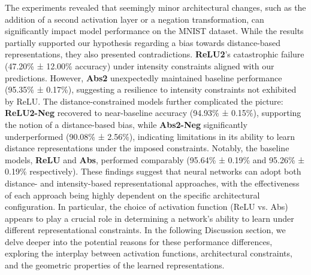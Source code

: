 The experiments revealed that seemingly minor architectural changes, such as the addition of a second activation layer or a negation transformation, can significantly impact model performance on the MNIST dataset. While the results partially supported our hypothesis regarding a bias towards distance-based representations, they also presented contradictions. \textbf{ReLU2}'s catastrophic failure (47.20\% ± 12.00\% accuracy) under intensity constraints aligned with our predictions. However, \textbf{Abs2} unexpectedly maintained baseline performance (95.35\% ± 0.17\%), suggesting a resilience to intensity constraints not exhibited by ReLU. The distance-constrained models further complicated the picture: \textbf{ReLU2-Neg} recovered to near-baseline accuracy (94.93\% ± 0.15\%), supporting the notion of a distance-based bias, while \textbf{Abs2-Neg} significantly underperformed (90.08\% ± 2.56\%), indicating limitations in its ability to learn distance representations under the imposed constraints. Notably, the baseline models, \textbf{ReLU} and \textbf{Abs}, performed comparably (95.64\% ± 0.19\% and 95.26\% ± 0.19\% respectively). These findings suggest that neural networks can adopt both distance- and intensity-based representational approaches, with the effectiveness of each approach being highly dependent on the specific architectural configuration. In particular, the choice of activation function (ReLU vs. Abs) appears to play a crucial role in determining a network's ability to learn under different representational constraints. In the following Discussion section, we delve deeper into the potential reasons for these performance differences, exploring the interplay between activation functions, architectural constraints, and the geometric properties of the learned representations.
